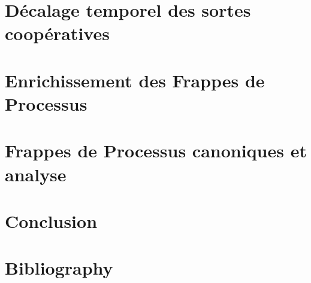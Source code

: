 \documentclass[fleqn,8pt,t]{beamer}
\begin{document}




\section{Décalage temporel des sortes coopératives}



\section{Enrichissement des Frappes de Processus}










\section{Frappes de Processus canoniques et analyse}







\section{Conclusion}%


\appendix

\section[x]{Bibliography}


\end{document}
